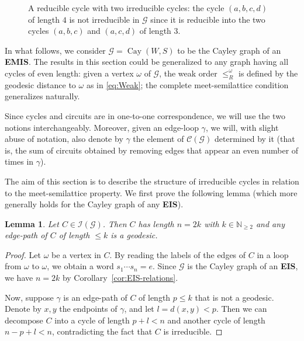 \documentclass[A4paper, oneside]{amsart}
\newcommand{\id}{\textit{e}}
\newcommand{\Cay}{\operatorname{Cay}}
\newcommand{\Irr}{\mathcal{I}}
\newcommand{\G}{\mathcal{G}}
\newcommand{\EIS}{\textnormal{\bf EIS}\xspace}
\newcommand{\EMIS}{\textnormal{\bf EMIS}\xspace}
\newtheorem{lem}[thm]{Lemma}
\theoremstyle{definition}
\begin{document}
\begin{figure}
    \centering
{}
    \caption{A reducible cycle with two irreducible cycles: the cycle $(a,b,c,d)$ of length $4$ is not irreducible in $\G$ since it is reducible into the two cycles $(a,b,c)$ and $(a,c,d)$ of length $3$.}
    \label{fig:exIrred}
\end{figure}

In what follows, we consider $\G=\Cay(W,S)$ to be the Cayley graph of an \EMIS. The results in this section could be generalized to any graph having all cycles of even length: given a vertex $\omega$ of $\G$, the weak order $\leq_R^\omega$ is defined by the geodesic distance to $\omega$ as in \eqref{eq:Weak}; the complete meet-semilattice condition generalizes naturally. 

Since cycles and circuits are in one-to-one correspondence, we will use the two notions interchangeably. Moreover, given an edge-loop $\gamma$, we will, with slight abuse of notation, also denote by $\gamma$ the element of $\mathcal{C}(\G)$ determined by it (that is, the sum of circuits obtained by removing edges that appear an even number of times in $\gamma$). 

The aim of this section is to describe the structure of irreducible cycles in relation to the meet-semilattice property. We first prove the following lemma (which more generally holds for the Cayley graph of any \EIS).

\begin{lem} \label{lem-geo}
    Let $C \in \Irr(\G)$. Then $C$ has length $n=2k$ with $k\in\mathbb N_{\geq 2}$ and any edge-path of $C$ of length $ \leq k$ is a geodesic.
\end{lem}

\begin{proof} Let $\omega$ be a vertex in $C$. By reading the labels of the edges of $C$ in a loop from $\omega$ to $\omega$, we obtain a word $s_1\cdots s_n=\id$. Since $\G$ is the Cayley graph of an \EIS,  we have $n=2k$  by Corollary~\ref{cor:EIS-relations}.
    
    Now, suppose $\gamma$ is an edge-path of $C$ of length $p \leq k$ that is not a geodesic. Denote by $x,y$ the endpoints of $\gamma$, and let $l=d(x,y)<p$. Then we can decompose $C$ into a cycle of length $p+l<n$ and another cycle of length $n-p+l<n$, contradicting the fact that $C$ is irreducible. 
\end{proof}
\end{document}

